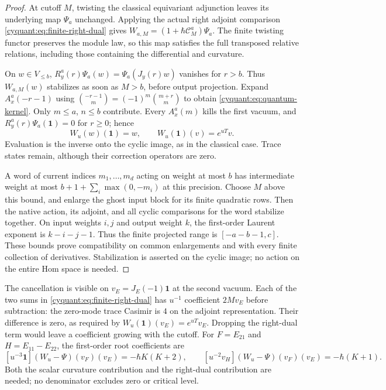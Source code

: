 \begin{proof}
At cutoff $M$, twisting the classical equivariant adjunction leaves
its underlying map $\Psi_a$ unchanged.  Applying the actual right
adjoint comparison \eqref{cyquant:eq:finite-right-dual} gives
$W_{a,M}=(1+\hbar\mathcal C_M^a)\Psi_a$.
The finite twisting functor preserves the module law, so this map
satisfies the full transposed relative relations, including those
containing the differential and curvature.

On $w\in V_{\leq b}$,
$R_y^a(r)\Psi_a(w)=\Psi_a(J_y(r)w)$ vanishes for $r>b$.
Thus $W_{a,M}(w)$ stabilizes as soon as $M>b$, before output
projection.  Expand $A_x^a(-r-1)$ using
$\binom{-r-1}{m}=(-1)^m\binom{m+r}{m}$ to obtain
\eqref{cyquant:eq:quantum-kernel}.  Only $m\leq a$, $n\leq b$
contribute.  Every $A_x^a(m)$ kills the first vacuum, and
$R_y^a(r)\Psi_a(\mathbf1)=0$ for $r\geq0$; hence
\[
 W_u(w)(\mathbf1)=w,\qquad W_u(\mathbf1)(v)=e^{uT}v.
\]
Evaluation is the inverse onto the cyclic image, as in the classical
case.  Trace states remain, although their correction operators are zero.

A word of current indices $m_1,\ldots,m_d$ acting on weight at most
$b$ has intermediate weight at most
$b+1+\sum_i\max(0,-m_i)$ at this precision.  Choose $M$ above this
bound, and enlarge the ghost input block for its finite quadratic
rows.  Then the native action, its adjoint, and all cyclic comparisons
for the word stabilize together.  On input weights $i,j$ and output
weight $k$, the first-order Laurent exponent is $k-i-j-1$.
Thus the finite projected range is $[-a-b-1,c]$.
These bounds prove compatibility on common enlargements and with
every finite collection of derivatives.  Stabilization is asserted on
the cyclic image; no action on the entire Hom space is needed.
\end{proof}

The cancellation is visible on $v_E=J_E(-1)\mathbf1$ at the second
vacuum.  Each of the two sums in
\eqref{cyquant:eq:finite-right-dual} has $u^{-1}$ coefficient
$2Mv_E$ before subtraction: the zero-mode trace Casimir is $4$
on the adjoint representation.  Their difference is zero, as required
by $W_u(\mathbf1)(v_E)=e^{uT}v_E$.  Dropping the right-dual term
would leave a coefficient growing with the cutoff.
For $F=E_{21}$ and $H=E_{11}-E_{22}$, the first-order root coefficients
are
\[
 [u^{-3}\mathbf1](W_u-\Psi)(v_F)(v_E)=-\hbar K(K+2),
 \qquad
 [u^{-2}v_H](W_u-\Psi)(v_F)(v_E)=-\hbar(K+1).
\]
Both the scalar curvature contribution and the right-dual contribution
are needed; no denominator excludes zero or critical level.

